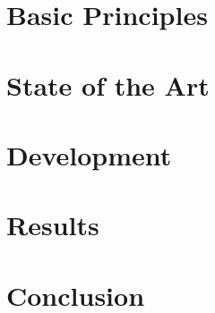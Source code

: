 \documentclass[12pt]{report}
\begin{document}


\chapter{Basic Principles}



\chapter{State of the Art}



\chapter{Development}



\chapter{Results}



\chapter{Conclusion}





%

\clearpage


\printbibliography




\end{document}
